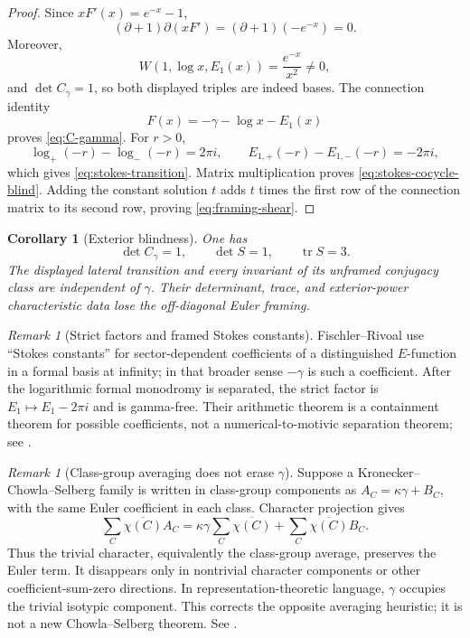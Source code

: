 \documentclass[11pt]{article}
\theoremstyle{keio}
\newtheorem{corollary}[theorem]{Corollary}
\theoremstyle{definition}
\theoremstyle{remark}
\newtheorem{remark}[theorem]{Remark}
\begin{document}
\begin{proof}
Since \(xF'(x)=e^{-x}-1\),
\[
 (\partial+1)\partial(xF')=(\partial+1)(-e^{-x})=0.
\]
Moreover,
\[
 W(1,\log x,E_1(x))=\frac{e^{-x}}{x^2}\ne0,
\]
and \(\det C_\gamma=1\), so both displayed triples are indeed bases.
The connection identity
\[
 F(x)=-\gamma-\log x-E_1(x)
\]
proves \eqref{eq:C-gamma}.  For \(r>0\),
\[
 \log_+(-r)-\log_-(-r)=2\pi i,
 \qquad
 E_{1,+}(-r)-E_{1,-}(-r)=-2\pi i,
\]
which gives \eqref{eq:stokes-transition}.  Matrix multiplication proves
\eqref{eq:stokes-cocycle-blind}.  Adding the constant solution \(t\) adds
\(t\) times the first row of the connection matrix to its second row,
proving \eqref{eq:framing-shear}.
\end{proof}

\begin{corollary}[Exterior blindness]
\label{cor:stokes-exterior-blind}
One has
\[
 \det C_\gamma=1,
 \qquad \det S=1,
 \qquad \operatorname{tr}S=3.
\]
The displayed lateral transition and every invariant of its unframed
conjugacy class are independent of \(\gamma\).  Their determinant, trace,
and exterior-power characteristic data lose the off-diagonal Euler framing.
\end{corollary}

\begin{remark}[Strict factors and framed Stokes constants]
Fischler--Rivoal use ``Stokes constants'' for sector-dependent coefficients
of a distinguished \(E\)-function in a formal basis at infinity; in that
broader sense \(-\gamma\) is such a coefficient.  After the logarithmic
formal monodromy is separated, the strict factor is
\(E_1\mapsto E_1-2\pi i\) and is gamma-free.  Their arithmetic theorem is a
containment theorem for possible coefficients, not a numerical-to-motivic
separation theorem; see \cite{FischlerRivoal2016}.
\end{remark}

\begin{remark}[Class-group averaging does not erase \(\gamma\)]
\label{rem:Chowla-Selberg-correction}
Suppose a Kronecker--Chowla--Selberg family is written in class-group
components as \(A_C=\kappa\gamma+B_C\), with the same Euler coefficient in
each class.  Character projection gives
\[
 \sum_C\overline{\chi(C)}A_C
 =\kappa\gamma\sum_C\overline{\chi(C)}
 +\sum_C\overline{\chi(C)}B_C.
\]
Thus the trivial character, equivalently the class-group average, preserves
the Euler term.  It disappears only in nontrivial character components or
other coefficient-sum-zero directions.  In representation-theoretic
language, \(\gamma\) occupies the trivial isotypic component.  This corrects
the opposite averaging heuristic; it is not a new Chowla--Selberg theorem.
See \cite{GrossCS}.
\end{remark}
\end{document}
